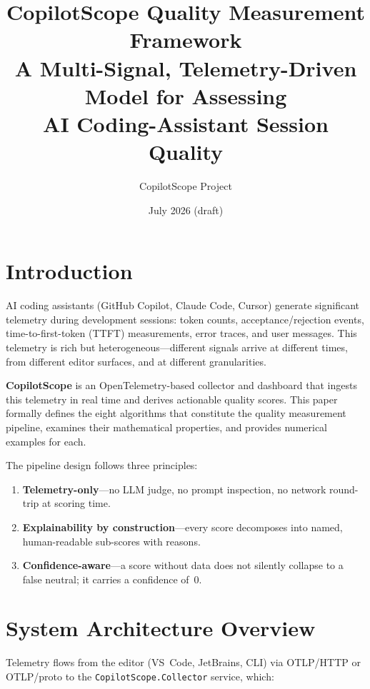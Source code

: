 \documentclass[11pt,a4paper]{article}
\title{%
  \textbf{CopilotScope Quality Measurement Framework}\\[0.4em]
  \large A Multi-Signal, Telemetry-Driven Model for Assessing\\
  AI Coding-Assistant Session Quality
}
\author{CopilotScope Project}
\date{July 2026 \quad (draft)}
\begin{document}
\maketitle
\tableofcontents
\newpage

\section{Introduction}
\label{sec:intro}

AI coding assistants (GitHub Copilot, Claude Code, Cursor) generate significant
telemetry during development sessions: token counts, acceptance/rejection events,
time-to-first-token (TTFT) measurements, error traces, and user messages.
This telemetry is rich but heterogeneous---different signals arrive at different
times, from different editor surfaces, and at different granularities.

\textbf{CopilotScope} is an OpenTelemetry-based collector and dashboard that
ingests this telemetry in real time and derives actionable quality scores.
This paper formally defines the eight algorithms that constitute the quality
measurement pipeline, examines their mathematical properties, and provides
numerical examples for each.

The pipeline design follows three principles:
\begin{enumerate}
  \item \textbf{Telemetry-only}---no LLM judge, no prompt inspection, no
        network round-trip at scoring time.
  \item \textbf{Explainability by construction}---every score decomposes into
        named, human-readable sub-scores with reasons.
  \item \textbf{Confidence-aware}---a score without data does not silently
        collapse to a false neutral; it carries a confidence of~0.
\end{enumerate}

\section{System Architecture Overview}
\label{sec:architecture}

Telemetry flows from the editor (VS~Code, JetBrains, CLI) via OTLP/HTTP or
OTLP/proto to the \texttt{CopilotScope.Collector} service, which:
\end{document}
